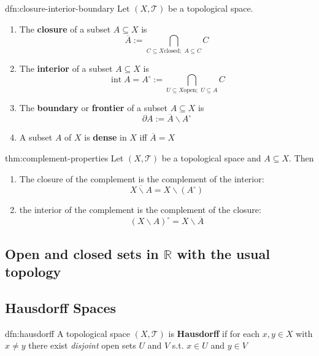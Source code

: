 \documentclass{article}
\DeclareMathOperator{\Int}{int}
\begin{document}
\begin{dfn}{dfn:closure-interior-boundary}{}
    Let $(X, \mathcal{T})$ be a topological space.
    \begin{enumerate}
        \item The \textbf{closure} of a subset $A \subseteq X$ is
            \[\overline{A} := \bigcap\limits_{C \subseteq X \text{closed};\,\, A \subseteq C} C\]
        \item The \textbf{interior} of a subset $A \subseteq X$ is
            \[\Int{A} = A^{\circ} := \bigcap\limits_{U \subseteq X \text{open};\,\, U \subseteq A} C\]
        \item The \textbf{boundary} or \textbf{frontier} of a subset $A \subseteq X$ is
            \[\partial A := \overline{A} \backslash A^{\circ}\]
        \item A subset $A$ of $X$ is \textbf{dense} in $X$ iff $\overline{A} = X$
    \end{enumerate}
\end{dfn}

\begin{thm}{thm:complement-properties}{}
    Let $(X, \mathcal{T})$ be a topological space and $A \subseteq X$. Then
    \begin{enumerate}
        \item The closure of the complement is the complement of the interior:
            \[\overline{X \backslash A} = X \backslash (A^{\circ})\]
        \item the interior of the complement is the complement of the closure:
            \[(X \backslash A)^{\circ} = X \backslash \overline{A}\]
    \end{enumerate}
\end{thm}

\subsection{Open and closed sets in \texorpdfstring{$\mathbb{R}$}{R} with the usual topology}

\newpage
\subsection{Hausdorff Spaces}
\begin{dfn}{dfn:hausdorff}{}
    A topological space $(X, \mathcal{T})$ is \textbf{Hausdorff} if for each $x, y\in X$ with $x\ne y$ there exist \textit{disjoint} open sets $U$ and $V$ s.t. $x\in U$ and $y\in V$
\end{dfn}
\end{document}
